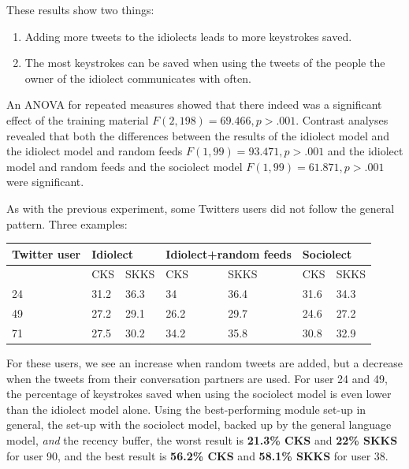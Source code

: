 \documentclass[11pt]{article}
\let\originaltable\table
\let\endoriginaltable\endtable
\renewenvironment{table}[1][ht]{%
  \originaltable[#1]
  \centering}%
  {\endoriginaltable}
\begin{document}
These results show two things:

\begin{enumerate}
\item Adding more tweets to the idiolects leads to more keystrokes saved.
\item The most keystrokes can be saved when using the tweets of the people the owner of the idiolect communicates with often.
\end{enumerate}

An ANOVA for repeated measures showed that there indeed was a significant effect of the training material $F(2,198) = 69.466, p > .001$. Contrast analyses revealed that both the differences between the results of the idiolect model and the idiolect model and random feeds $F(1,99) = 93.471, p > .001$ and the idiolect model and random feeds and the sociolect model $F(1,99) = 61.871, p > .001$ were significant.

As with the previous experiment, some Twitters users did not follow the general pattern. Three examples:

\begin{table}[H] 
\centering
\begin{tabular}{l|llllll} 
Twitter user&\multicolumn{2}{l}{Idiolect}&\multicolumn{2}{l}{Idiolect+random feeds}&\multicolumn{2}{l}{Sociolect}\\
\hline
&CKS&SKKS&CKS&SKKS&CKS&SKKS\\
24&31.2&36.3&34&36.4&31.6&34.3\\
49&27.2&29.1&26.2&29.7&24.6&27.2\\
71&27.5&30.2&34.2&35.8&30.8&32.9\\
\end{tabular} 
\caption{Percentage of keystrokes saved for 3 individual Twitter users, using the the idiolect, control and sociolect models}
\end{table}

For these users, we see an increase when random tweets are added, but a decrease when the tweets from their conversation partners are used. For user 24 and 49, the percentage of keystrokes saved when using the sociolect model is even lower than the idiolect model alone.  Using the best-performing module set-up in general, the set-up with the sociolect model, backed up by the general language model, \emph{and} the recency buffer, the worst result is \textbf{21.3\% CKS} and \textbf{22\% SKKS} for user 90, and the best result is \textbf{56.2\% CKS} and \textbf{58.1\% SKKS} for user 38.
\end{document}
